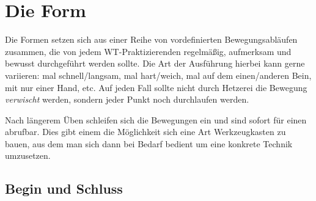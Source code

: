 

\newenvironment{WTSatz}[1]
	{\WTGaleryResetSlideshowCounter \subsection{#1}}
	{}

\newenvironment{WTSatzTeil}[2]
	{\paragraph{#1} (\textit{#2})}
	{}

\def\WTXFormen_EingangsGraphics#1{\texttt{[image: resources/images/eingangsform/\#1]}}


\def\WTSatzTechniken#1{\textbf{Ge\"ubte Techniken}: #1}

\def\WTKurzSatz#1#2#3{\paragraph{#1. #2} #3 (BILD!!! /resources/images/form/siunimtao/kurzsatz/#1.jpg)}




\renewcommand\chapterillustration{pushing_minimalistisch}
\chapter{Die Form}

Die Formen setzen sich aus einer Reihe von vordefinierten Bewegungsabl\"aufen zusammen, die von jedem WT-Praktizierenden regelm\"a{\ss}ig, aufmerksam und bewusst durchgef\"uhrt werden sollte. Die Art der Ausf\"uhrung hierbei kann gerne variieren: mal schnell/langsam, mal hart/weich, mal auf dem einen/anderen Bein, mit nur einer Hand, etc. Auf jeden Fall sollte nicht durch Hetzerei die Bewegung \textit{verwischt} werden, sondern jeder Punkt noch durchlaufen werden.

Nach l\"angerem \"Uben schleifen sich die Bewegungen ein und sind sofort f\"ur einen abrufbar. Dies gibt einem die M\"oglichkeit sich eine Art Werkzeugkasten zu bauen, aus dem man sich dann bei Bedarf bedient um eine konkrete Technik umzusetzen.


\newpage


\section{Begin und Schluss}


